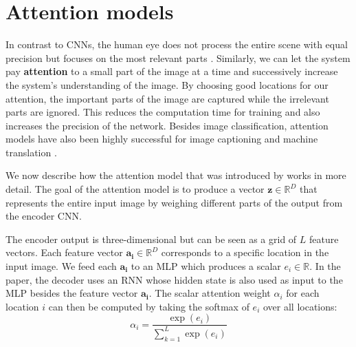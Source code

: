 \section{Attention models}
\label{ssec:attention}


In contrast to CNNs, the human eye does not process the entire scene with equal precision but focuses on the most relevant parts \cite{DeepMindAttention}.
Similarly, we can let the system pay \textbf{attention} to a small part of the image at a time and successively increase the system's understanding of the image.
By choosing good locations for our attention, the important parts of the image are captured while the irrelevant parts are ignored.
This reduces the computation time for training and also increases the precision of the network.
Besides image classification, attention models have also been highly successful for image captioning \cite{AttendAndTell} and machine translation \cite{machine_translation_attention}.

We now describe how the attention model that was introduced by \textcite{machine_translation_attention} works in more detail.
The goal of the attention model is to produce a vector $\mathbf{z} \in \mathbb{R}^D$ that represents the entire input image by weighing different parts of the output from the encoder CNN.

The encoder output is three-dimensional but can be seen as a grid of $L$ feature vectors. Each feature vector $\mathbf{a_i} \in \mathbb{R}^D$ corresponds to a specific location in the input image. We feed each $\mathbf{a_i}$ to an MLP which produces a scalar $e_i \in \mathbb{R}$. In the paper, the decoder uses an RNN whose hidden state is also used as input to the MLP besides the feature vector $\mathbf{a_i}$.
The scalar attention weight $\alpha_i$ for each location $i$ can then be computed by taking the softmax of $e_i$ over all locations:
\[
\alpha_i = \frac{ \exp(e_i) }{ \sum_{k=1}^L \exp(e_i) }
\]

